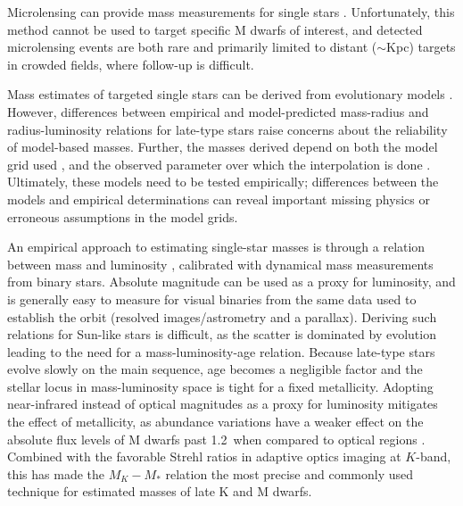 \documentclass[twocolumn]{aastex62}
\begin{document}
Microlensing can provide mass measurements for single stars \citep[e.g.,][]{2016ApJ...825...60Z,2017ApJ...838..154C,2017AJ....154..176S}. Unfortunately, this method cannot be used to target specific M dwarfs of interest, and detected microlensing events are both rare and primarily limited to distant ($\sim$Kpc) targets in crowded fields, where follow-up is difficult. 

Mass estimates of targeted single stars can be derived from evolutionary models \citep[e.g.,][]{Muirhead2012a}. However, differences between empirical and model-predicted mass-radius and radius-luminosity relations for late-type stars \citep[e.g.,][]{Boyajian2012,Feiden2012a} raise concerns about the reliability of model-based masses. Further, the masses derived depend on both the model grid used \citep{Spada2013,MIST1}, and the observed parameter over which the interpolation is done \citep[e.g., color versus luminosity,][]{Mann:2012,Mann2015b}. Ultimately, these models need to be tested empirically; differences between the models and empirical determinations can reveal important missing physics or erroneous assumptions in the model grids. 

An empirical approach to estimating single-star masses is through a relation between mass and luminosity \citep[e.g.,][]{Hen1993, Delfosse2000}, calibrated with dynamical mass measurements from binary stars. Absolute magnitude can be used as a proxy for luminosity, and is generally easy to measure for visual binaries from the same data used to establish the orbit (resolved images/astrometry and a parallax). Deriving such relations for Sun-like stars is difficult, as the scatter is dominated by evolution \citep[e.g.,][]{1991A&ARv...3...91A,2010A&ARv..18...67T} leading to the need for a mass-luminosity-age relation. Because late-type stars evolve slowly on the main sequence, age becomes a negligible factor and the stellar locus in mass-luminosity space is tight for a fixed metallicity. Adopting near-infrared instead of optical magnitudes as a proxy for luminosity mitigates the effect of metallicity, as abundance variations have a weaker effect on the absolute flux levels of M dwarfs past 1.2\um\ when compared to optical regions \citep{Delfosse2000,Bonfils:2005}. Combined with the favorable Strehl ratios in adaptive optics imaging at $K$-band, this has made the $M_K-M_*$ relation the most precise and commonly used technique for estimated masses of late K and M dwarfs. 
\end{document}

